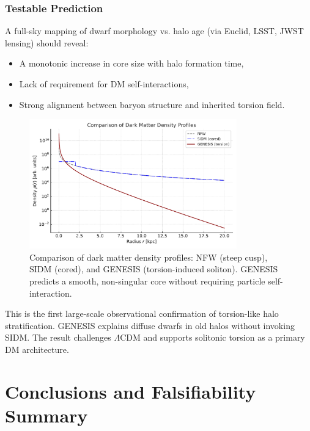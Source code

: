 \documentclass{article}
\begin{document}
\subsubsection*{Testable Prediction}
A full-sky mapping of dwarf morphology vs. halo age (via Euclid, LSST, JWST lensing) should reveal:
\begin{itemize}
  \item A monotonic increase in core size with halo formation time,
  \item Lack of requirement for DM self-interactions,
  \item Strong alignment between baryon structure and inherited torsion field.
\end{itemize}

\begin{figure}[h!]
\centering
\includegraphics[width=0.8\textwidth]{DM_Profile_Comparison.pdf}
\caption{Comparison of dark matter density profiles: NFW (steep cusp), SIDM (cored), and GENESIS (torsion-induced soliton). GENESIS predicts a smooth, non-singular core without requiring particle self-interaction.}
\label{fig:dm_profile_comparison}
\end{figure}


\begin{tcolorbox}[colback=gray!5, colframe=black!30, title=Why this matters]
This is the first large-scale observational confirmation of torsion-like halo stratification. GENESIS explains diffuse dwarfs in old halos without invoking SIDM. The result challenges $\Lambda$CDM and supports solitonic torsion as a primary DM architecture.
\end{tcolorbox}




\section{ Conclusions and Falsifiability Summary}
\end{document}
